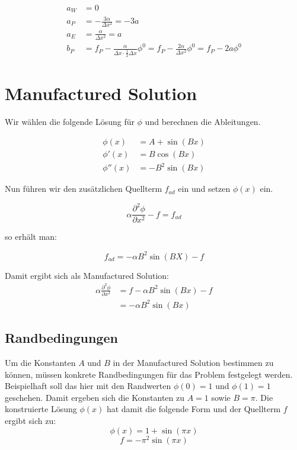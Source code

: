 \documentclass[10pt, ngerman,colorback,accentcolor=tud2d]{tudreport}
\begin{document}
\begin{align*}
  a_W &= 0\\
  a_P &=  -\frac{3 \alpha}{\Delta x^2} = -3a\\
  a_E &= \frac{\alpha}{\Delta x^2} = a\\
  b_P &= f_P - \frac{\alpha}{\Delta x \cdot \frac{1}{2} \Delta x}\phi^0 = f_P - 
  \frac{2\alpha}{\Delta x^2} \phi^0 = f_P - 2a \phi^0
\end{align*}

\chapter{Manufactured Solution}

Wir wählen die folgende Lösung für $\phi$ und berechnen die Ableitungen.

\begin{align*}
  \phi(x) &= A + \sin(Bx)\\
  \phi'(x) &= B \cos(Bx)\\
  \phi''(x) &= -B^2\sin(Bx)
\end{align*}

Nun führen wir den zusätzlichen Quellterm $f_{ad}$ ein und setzen $\phi(x)$ ein.

\begin{equation*}
  \alpha\frac{\partial^2 \phi}{\partial x^2}-f=f_{ad}
\end{equation*}

so erhält man:

\begin{equation*}
  f_{ad} = -\alpha B^2\sin(BX)-f
\end{equation*}

Damit ergibt sich als Manufactured Solution:
\begin{align}
  \alpha\frac{\partial^2 \phi}{\partial x^2} &= f -\alpha B^2\sin(Bx)-f\\
                                             &= -\alpha B^2\sin(Bx)
\end{align}

\section{Randbedingungen}
\label{sec:Randbedingungen}

Um die Konstanten $A$ und $B$ in der Manufactured Solution bestimmen zu können,
müssen konkrete Randbedingungen für das Problem festgelegt werden. Beispielhaft
soll das hier mit den Randwerten $\phi(0) = 1$ und $\phi(1) = 1$ geschehen.
Damit ergeben sich die Konstanten zu $A = 1$ sowie $B = \pi$. Die 
konstruierte Lösung $\phi(x)$ hat damit die folgende Form und der Quellterm $f$
ergibt sich zu:
\begin{equation*}
  \phi(x) = 1 + \sin(\pi x)
\end{equation*}
\begin{equation}
  f=-\pi^2 \sin(\pi x)
  \label{eq:quellterm}
\end{equation}
\end{document}
